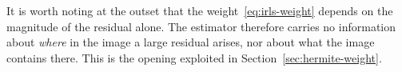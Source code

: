 It is worth noting at the outset that the weight~\eqref{eq:irls-weight}
depends on the magnitude of the residual alone. The estimator therefore
carries no information about \emph{where} in the image a large residual
arises, nor about what the image contains there. This is the opening exploited
in Section~\ref{sec:hermite-weight}.

%
%
